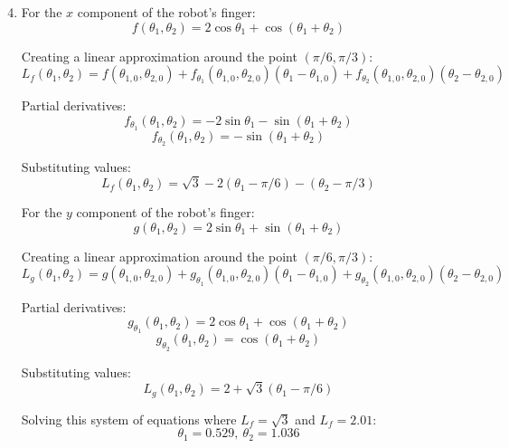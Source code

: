 \documentclass{article}
\begin{document}
\begin{enumerate}[1.]
  \setcounter{enumi}{3}
  \item For the $x$ component of the robot's finger:
    $$ f(\theta_{1}, \theta_{2}) = 2 \cos \theta_{1} + \cos (\theta_{1} +
    \theta_{2}) $$

    Creating a linear approximation around the point $(\pi / 6, \pi / 3)$:
    $$ L_{f}(\theta_{1}, \theta_{2}) = f(\theta_{1,0}, \theta_{2,0}) +
    f_{\theta_{1}}(\theta_{1,0}, \theta_{2,0})(\theta_{1} - \theta_{1,0}) +
    f_{\theta_{2}}(\theta_{1,0}, \theta_{2,0})(\theta_{2} - \theta_{2,0}) $$

    Partial derivatives:
    $$ f_{\theta_{1}}(\theta_{1}, \theta_{2}) = -2 \sin \theta_{1} - \sin
    (\theta_{1} + \theta_{2}) $$
    $$ f_{\theta_{2}}(\theta_{1}, \theta_{2}) = -\sin (\theta_{1} + \theta_{2}) $$

    Substituting values:
    $$ L_{f}(\theta_{1}, \theta_{2}) = \sqrt{3} - 2(\theta_{1} - \pi / 6) -
    (\theta_{2} - \pi / 3) $$

    For the $y$ component of the robot's finger:
    $$ g(\theta_{1}, \theta_{2}) = 2 \sin \theta_{1} + \sin (\theta_{1} +
    \theta_{2}) $$

    Creating a linear approximation around the point $\left( \pi / 6, \pi / 3
    \right)$:
    $$ L_{g}(\theta_{1}, \theta_{2}) = g(\theta_{1,0}, \theta_{2,0}) +
    g_{\theta_{1}}(\theta_{1,0}, \theta_{2,0})(\theta_{1} - \theta_{1,0}) +
    g_{\theta_{2}}(\theta_{1,0}, \theta_{2,0})(\theta_{2} - \theta_{2,0}) $$

    Partial derivatives:
    $$ g_{\theta_{1}}(\theta_{1}, \theta_{2}) = 2 \cos \theta_{1} + \cos
    (\theta_{1} + \theta_{2}) $$
    $$ g_{\theta_{2}}(\theta_{1}, \theta_{2}) = \cos (\theta_{1} + \theta_{2}) $$

    Substituting values:
    $$ L_{g}(\theta_{1}, \theta_{2}) = 2 + \sqrt{3} (\theta_{1} - \pi / 6)$$

    Solving this system of equations where $L_{f} = \sqrt{3}$ and $L_{f} = 2.01$:
    $$ \theta_{1} = 0.529,\ \theta_{2} = 1.036 $$
\end{enumerate}
\end{document}
